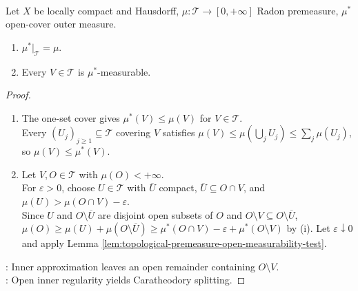 \begin{proposition} \label{prop:radon-premeasure-open-sets-measurable} \\
Let $X$ be locally compact and Hausdorff, $\mu:\mathcal{T}\to[0,+\infty]$ Radon premeasure,  $\mu^\ast$ open-cover outer measure.
\begin{enumerate}[label=(\roman*)]
\setlength{\itemsep}{0pt}
\item $\mu^\ast|_{\mathcal{T}}=\mu$.
\item Every $V\in\mathcal{T}$ is $\mu^\ast$-measurable.
\end{enumerate}
\begin{proof}
\begin{enumerate}[label=(\roman*)]
\setlength{\itemsep}{0pt}
\item[(i)] The one-set cover gives $\mu^\ast(V)\leq\mu(V)$ for $V\in\mathcal{T}$.\\
Every $(U_j)_{j\geq1}\subseteq\mathcal{T}$ covering $V$ satisfies $\mu(V)\leq\mu(\bigcup_jU_j)\leq\sum_j\mu(U_j)$, so $\mu(V)\leq\mu^\ast(V)$.
\item[(ii)] Let $V,O\in\mathcal{T}$ with $\mu(O)<+\infty$.\\
For $\varepsilon>0$, choose $U\in\mathcal{T}$ with $\overline{U}$ compact, $\overline{U}\subseteq O\cap V$, and $\mu(U)>\mu(O\cap V)-\varepsilon$.\\
Since $U$ and $O\setminus\overline{U}$ are disjoint open subsets of $O$ and $O\setminus V\subseteq O\setminus\overline{U}$,\\
$\mu(O)\geq\mu(U)+\mu(O\setminus\overline{U})\geq\mu^\ast(O\cap V)-\varepsilon+\mu^\ast(O\setminus V)$ by (i). Let $\varepsilon\downarrow0$ and apply Lemma \ref{lem:topological-premeasure-open-measurability-test}.
\end{enumerate}
: Inner approximation leaves an open remainder containing $O\setminus V$.\\
: Open inner regularity yields Caratheodory splitting.
\end{proof}
\end{proposition}

